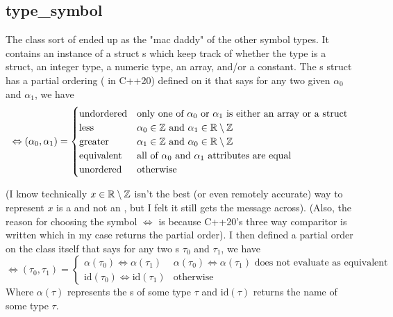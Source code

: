 \documentclass{article}
\begin{document}
\subsection{type\_symbol}
\label{symbol:typesymbol}
The  class sort of ended up as the "mac daddy" of the other symbol types.
It contains an instance of a struct s which keep track of whether the type is a struct, an integer type, a numeric type, an array, and/or a constant.
The s struct has a partial ordering ( in C++20) defined on it that says for any two given  $\alpha_0$ and $\alpha_1$, we have
\begin{equation*}
    \Leftrightarrow (\alpha_0,\alpha_1) = 
    \begin{cases}
        \text{undordered} & \text{only one of $\alpha_0$ or $\alpha_1$ is either an array or a struct} \\
        \text{less} & \alpha_0\in\mathbb{Z} \text{ and } \alpha_1\in\mathbb{R}\setminus\mathbb{Z} \\
        \text{greater} & \alpha_1\in\mathbb{Z} \text{ and } \alpha_0\in\mathbb{R}\setminus\mathbb{Z} \\
        \text{equivalent} & \text{all of $\alpha_0$ and $\alpha_1$ attributes are equal} \\
        \text{unordered} & \text{otherwise}
    \end{cases}
\end{equation*}

(I know technically $x\in\mathbb{R}\setminus\mathbb{Z}$ isn't the best (or even remotely accurate) way to represent $x$ is a  and not an , but I felt it still gets the message across).
(Also, the reason for choosing the symbol $\Leftrightarrow$ is because C++20's three way comparitor is written \code{<=>} which in my case returns the partial order).
I then defined a partial order on the  class itself that says for any two s $\tau_0$ and $\tau_1$, we have
\begin{equation*}
    \Leftrightarrow (\tau_0, \tau_1) =
    \begin{cases}
        \alpha(\tau_0) \Leftrightarrow \alpha(\tau_1) & \alpha(\tau_0) \Leftrightarrow \alpha(\tau_1) \text{ does not evaluate as equivalent} \\
        \text{id}(\tau_0) \Leftrightarrow \text{id}(\tau_1) & \text{otherwise}
    \end{cases}
\end{equation*}
Where $\alpha(\tau)$ represents the s of some type $\tau$ and id$(\tau)$ returns the name of some type $\tau$.
\end{document}
